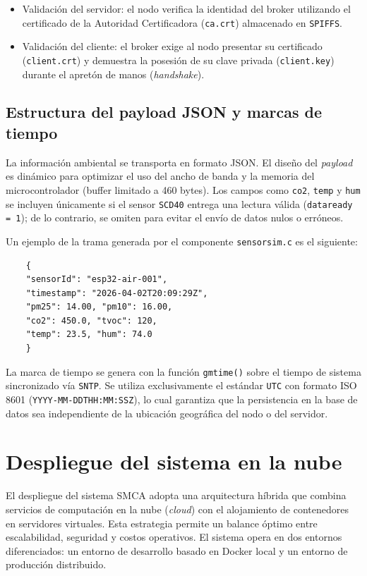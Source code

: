 \begin{itemize}
    \item Validación del servidor: el nodo verifica la identidad del broker utilizando el certificado de la Autoridad Certificadora (\texttt{ca.crt}) almacenado en \texttt{SPIFFS}.
    \item Validación del cliente: el broker exige al nodo presentar su certificado (\texttt{client.crt}) y demuestra la posesión de su clave privada (\texttt{client.key}) durante el apretón de manos (\textit{handshake}).
\end{itemize}

\subsection{Estructura del payload JSON y marcas de tiempo}

La información ambiental se transporta en formato JSON. El diseño del \textit{payload} es dinámico para optimizar el uso del ancho de banda y la memoria del microcontrolador (buffer limitado a 460 bytes). Los campos como \texttt{co2}, \texttt{temp} y \texttt{hum} se incluyen únicamente si el sensor \texttt{SCD40} entrega una lectura válida (\texttt{data\textunderscore ready = 1}); de lo contrario, se omiten para evitar el envío de datos nulos o erróneos.

Un ejemplo de la trama generada por el componente \texttt{sensor\textunderscore sim.c} es el siguiente:

\begin{verbatim}
    {
    "sensorId": "esp32-air-001",
    "timestamp": "2026-04-02T20:09:29Z",
    "pm25": 14.00, "pm10": 16.00,
    "co2": 450.0, "tvoc": 120,
    "temp": 23.5, "hum": 74.0
    }
\end{verbatim}

La marca de tiempo se genera con la función \texttt{gmtime()} sobre el tiempo de sistema sincronizado vía \texttt{SNTP}. Se utiliza exclusivamente el estándar \texttt{UTC} con formato ISO 8601 (\texttt{YYYY-MM-DDTHH:MM:SSZ}), lo cual garantiza que la persistencia en la base de datos sea independiente de la ubicación geográfica del nodo o del servidor.

\section{Despliegue del sistema en la nube}

El despliegue del sistema SMCA adopta una arquitectura híbrida que combina servicios de computación en la nube (\textit{cloud}) con el alojamiento de contenedores en servidores virtuales. Esta estrategia permite un balance óptimo entre escalabilidad, seguridad y costos operativos. El sistema opera en dos entornos diferenciados: un entorno de desarrollo basado en Docker local y un entorno de producción distribuido.

